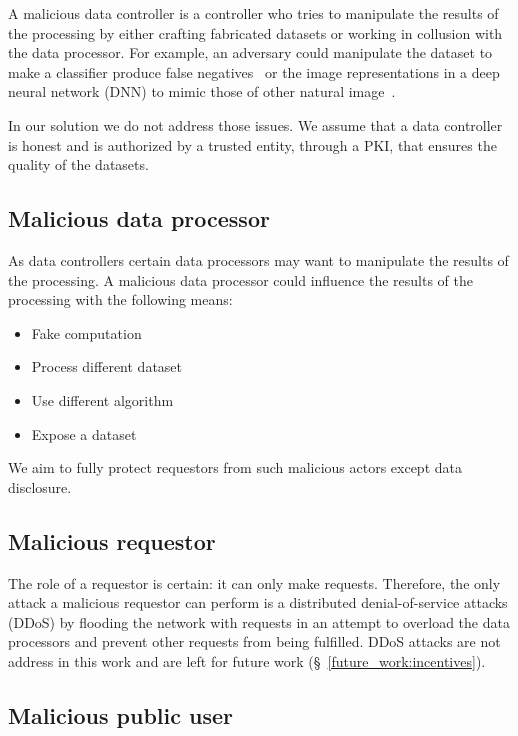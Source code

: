 A malicious data controller is a controller who tries to manipulate the results of the processing by either crafting fabricated datasets or working in collusion with the data processor. For example, an adversary could manipulate the dataset to make a classifier produce false negatives~\cite{dalvi2004adversarial} or the image representations in a deep neural network (DNN) to mimic those of other natural image~\cite{sabour2015adversarial}.

In our solution we do not address those issues. We assume that a data controller is honest and is authorized by a trusted entity, through a PKI, that ensures the quality of the datasets.

\subsection{Malicious data processor}
\label{solution:treat_model:mprocessor}

As data controllers certain data processors may want to manipulate the results of the processing. A malicious data processor could influence the results of the processing with the following means:

\begin{itemize}
  \item Fake computation
  \item Process different dataset
  \item Use different algorithm
  \item Expose a dataset
\end{itemize}

We aim to fully protect requestors from such malicious actors except data disclosure.

\subsection{Malicious requestor}
\label{solution:treat_model:mrequestor}

The role of a requestor is certain: it can only make requests. Therefore, the only attack a malicious requestor can perform is a distributed denial-of-service attacks (DDoS) by flooding the network with requests in an attempt to overload the data processors and prevent other requests from being fulfilled. DDoS attacks are not address in this work and are left for future work (§~\ref{future_work:incentives}).

\subsection{Malicious public user}
\label{solution:treat_model:mpublic_user}


